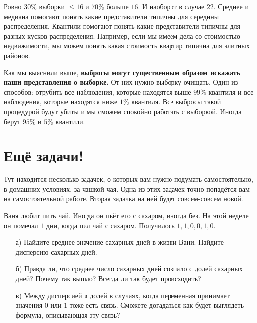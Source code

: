 \documentclass[12pt, a4paper, oneside]{article}
\theoremstyle{plain} %
\theoremstyle{definition}
\newcommand{\indef}[1]{\textbf{ \color{green} #1}}
\begin{document}
\begin{solution}
\begin{enumerate}
	Ровно $30\%$ выборки $ \le 16$ и $70\%$ больше $16$. И наоборот в случае $22$. Среднее и медиана помогают понять какие представители типичны для середины распределения. Квантили помогают понять какие представители типичны для разных кусков распределения. Например, если мы имеем дела со стоимостью недвижимости, мы можем понять какая стоимость квартир типична для элитных районов. 

	Как мы выяснили выше, \indef{выбросы могут существенным образом искажать наши представления о выборке.} От них нужно выборку очищать. Один из способов: отрубить все наблюдения, которые находятся выше $99\%$ квантиля и все наблюдения, которые находятся ниже $1\%$ квантиля. Все выбросы такой процедурой будут убиты и мы сможем спокойно работать с выборкой. Иногда берут $95\%$ и $5\%$ квантили. 
\end{enumerate}
\end{solution}



\section*{Ещё задачи!} 

Тут находится несколько задачек, о которых вам нужно подумать самостоятельно, в домашних условиях, за чашкой чая. Одна из этих задачек точно попадётся вам на самостоятельной работе. Вторая задачка на ней будет совсем-совсем новой. 

\begin{problem} 
Ваня любит пить чай. Иногда он пьёт его с сахаром, иногда без. На этой неделе он помечал $1$ дни, когда пил чай с сахаром. Получилось $1,1,0,0,1,0$.  

\begin{enumerate}
    \item[а)] Найдите среднее значение сахарных дней в жизни Вани. Найдите дисперсию сахарных дней.
    \item[б)] Правда ли, что среднее число сахарных дней совпало с долей сахарных дней? Почему так вышло? Всегда ли так будет происходить?
    \item[в)] Между дисперсией и долей в случаях, когда переменная принимает значения $0$ или $1$ тоже есть связь. Сможете догадаться как будет выглядеть формула, описывающая эту связь? 
\end{enumerate}
\end{problem} 
\end{document}
